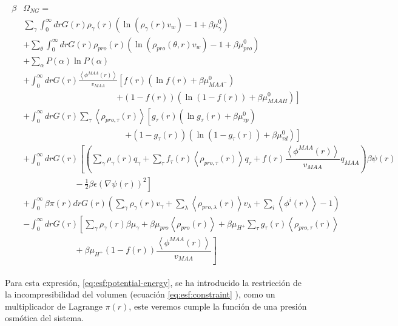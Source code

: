 \begin{align}
	\begin{aligned}
		\beta&\Omega_{NG}=\\&  \sum_{\gamma}\int_0^\infty{dr G(r)\rho_\gamma(r)\left(\ln \left(\rho_\gamma (r)v_w\right) -1 + \beta\mu^0_\gamma\right)} \\
		& +\sum_\theta \int_0^\infty{dr G(r)\rho_{pro}(r)\left(\ln (\rho_{pro}(\theta,r)v_w)-1 + \beta\mu^0_{pro} \right)} \\
		& + \sum_{\alpha}{P(\alpha)\ln P(\alpha)} \\
		& +\int_0^\infty drG(r) \frac{\left<\phi^{MAA}(r)\right>}{v_{MAA}} \left[f(r)(\ln f(r)+ \beta\mu^0_{MAA^-})\right.\\
		&\qquad \qquad \qquad\qquad \qquad \quad \left.+(1-f(r))(\ln (1-f(r))+\beta\mu^0_{MAAH})\right] \\
		& +\int_0^\infty drG(r)\sum_\tau \left<\rho_{pro,\tau}(r)\right> \left[g_\tau(r)(\ln g_\tau(r)+ \beta\mu^0_{\tau p})\right.\\
		&\qquad\qquad \qquad\qquad \qquad \qquad\left.+(1-g_\tau(r))(\ln (1-g_\tau(r))+\beta\mu^0_{\tau d})\right] \\
		& +  \int_0^\infty drG(r)\left[\left(\sum_{\gamma } {\rho_\gamma(r) q_\gamma + \sum_\tau{f_\tau(r) \left<\rho_{pro,\tau}(r)\right> q_\tau} +  f(r)\dfrac{\left<\phi^{MAA}(r)\right>}{v_{MAA}}q_{MAA}}\right)\beta\psi(r) \right.\\  &\left. \hspace{6em}-\frac{1}{2}\beta\epsilon(\nabla\psi(r))^2 \right]\\
		&+ \int_0^\infty \beta\pi(r) drG(r){\left(\sum_{\gamma}\rho_\gamma(r) v_\gamma + \sum_{\lambda}{\left<\rho_{pro,\lambda}(r)\right>}{v_\lambda} + \sum_i\left<\phi^i(r)\right> -1\right)}\\
		& -\int_0^\infty drG(r)\left[\sum_{\gamma }{\rho_\gamma(r)\beta\mu_\gamma}
		+ \beta\mu_{pro} \left<\rho_{pro}(r)\right>
		+\beta\mu_{H^+}\sum_{\tau}{g_\tau(r)\left<\rho_{pro,\tau}(r)\right> } \right.\\
		& \left. \hspace{6em} +\beta\mu_{H^+}(1-f(r))\dfrac{\left<\phi^{MAA}(r)\right>}{v_{MAA}}\right]%
	\end{aligned}
	\label{eq:esf:potential-energy}
\end{align}


Para esta expresi\'on,  \ref{eq:esf:potential-energy}, se ha introducido la restricci\'on de la incompresibilidad del volumen (ecuaci\'on \ref{eq:esf:constraint} ), como un  multiplicador  de  Lagrange $\pi(r)$, este veremos cumple la funci\'on de una presi\'on osm\'otica del sistema. 

